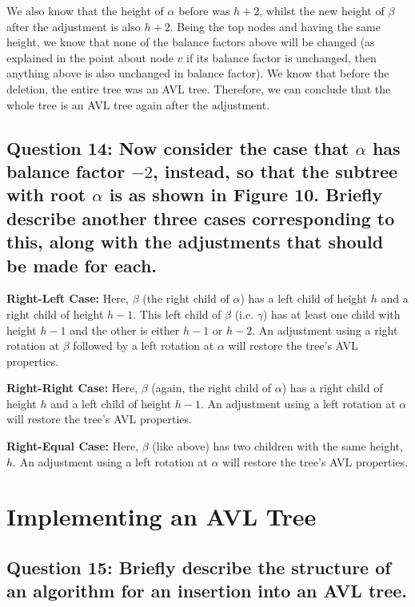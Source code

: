 \documentclass[a4paper, 12pt, titlepage]{article}
\begin{document}
We also know that the height of $\alpha$ before was $h+2$,
whilst the new height of $\beta$ after the adjustment is also $h+2$.
Being the top nodes and having the same height,
we know that none of the balance factors above will be changed
(as explained in the point about node $v$ if its balance factor is unchanged,
then anything above is also unchanged in balance factor).
We know that before the deletion,
the entire tree was an AVL tree.
Therefore,
we can conclude that the whole tree is an AVL tree again after the adjustment.

\subsection*{Question 14: Now consider the case that $\alpha$ has balance factor $-2$, instead, so that the subtree with root $\alpha$ is as shown in Figure 10. Briefly describe another three cases corresponding to this, along with the adjustments that should be made for each.} 

\noindent
\textbf{Right-Left Case:}
Here, $\beta$
(the right child of $\alpha$)
has a left child of height $h$ and a right child of height $h-1$.
This left child of $\beta$
(i.e. $\gamma$)
has at least one child with height $h-1$ and the other is either $h-1$ or $h-2$.
An adjustment using a right rotation at $\beta$ followed by a left rotation at $\alpha$ will restore the tree's AVL properties.

\noindent
\textbf{Right-Right Case:}
Here, $\beta$
(again, the right child of $\alpha$)
has a right child of height $h$ and a left child of height $h-1$.
An adjustment using a left rotation at $\alpha$ will restore the tree's AVL properties.

\noindent
\textbf{Right-Equal Case:}
Here, $\beta$
(like above)
has two children with the same height,
$h$.
An adjustment using a left rotation at $\alpha$ will restore the tree's AVL properties.

\section*{Implementing an AVL Tree}

\subsection*{Question 15: Briefly describe the structure of an algorithm for an insertion into an AVL tree.} 
\end{document}
